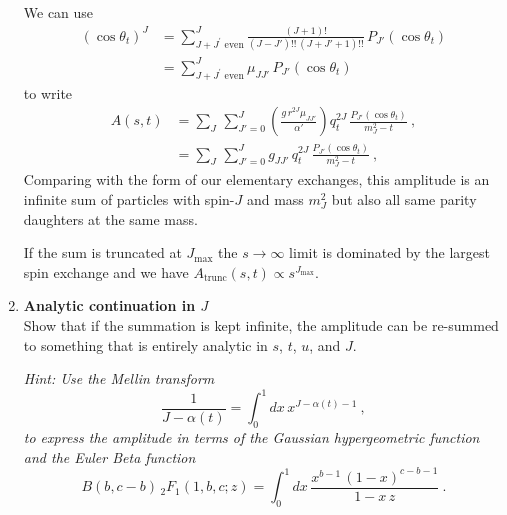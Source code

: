 \begin{enumerate}
\begin{solution}
              We can use
              \begin{align}
                  (\cos\theta_t)^J & = \sum_{J+J^\prime \text{ even}}^J \frac{(J+1)!}{(J-J')!! \, (J+J'+1)!!} \, P_{J'}(\cos\theta_t) \\
                                   & = \sum_{J+J^\prime \text{ even}}^J \mu_{JJ'} \, P_{J'}(\cos\theta_t)
              \end{align}
              to write
              \begin{align}
                  A(s,t) & = \sum_J \, \sum_{J'=0}^J \left(\frac{g \, r^{2J} \mu_{JJ'}}{\alpha'}\right) q_t^{2J} \, \frac{P_{J'}(\cos\theta_t)}{m_J^2 - t} ~,
                  \\
                         & = \sum_J \, \sum_{J'=0}^J g_{JJ'} \, q_t^{2J} \, \frac{P_{J'}(\cos\theta_t)}{m_J^2 - t} ~,
              \end{align}
              Comparing with the form of our elementary exchanges, this amplitude is an infinite sum of particles with spin-$J$ and mass $m_J^2$ but also all same parity daughters at the same mass.

              If the sum is truncated at $J_\text{max}$ the $s\to\infty$ limit is dominated by the largest spin exchange and we have $A_\text{trunc}(s,t) \propto s^{J_\text{max}}$.
          \end{solution}

    \item \textbf{Analytic continuation in $J$} \\
          Show that if the summation is kept infinite, the amplitude can be re-summed to something that is entirely analytic in $s$, $t$, $u$, and $J$.

          \noindent \textit{Hint: Use the Mellin transform
              \begin{equation}
                  \frac{1}{J-\alpha(t)} = \int_0^1 dx \, x^{J-\alpha(t) - 1} ~,
              \end{equation}
              to express the amplitude in terms of the Gaussian hypergeometric function and the Euler Beta function
              \begin{equation}
                  B(b, c-b) \, _2F_1(1, b, c; z) =  \int_0^1 dx \, \frac{ x^{b-1} \, (1-x)^{c-b-1}}{1-x \, z} ~.
              \end{equation}
          }


\end{enumerate}
